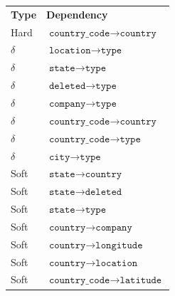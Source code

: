\documentclass{article}
\begin{document}
        \begin{table}[ht]
            \centering
            \begin{tabular}{|p{}|p{}|}
                \hline
                \textbf{Type} & \textbf{Dependency} \\ %
                \Xhline{2\arrayrulewidth}
                Hard & $\texttt{country\_code} \rightarrow \texttt{country}$ \\ %
                \hline
                $\delta$ & $\texttt{location} \rightarrow \texttt{type}$ \\
                \hline
                $\delta$ & $\texttt{state} \rightarrow \texttt{type}$ \\
                \hline
                $\delta$ & $\texttt{deleted} \rightarrow \texttt{type}$ \\
                \hline
                $\delta$ & $\texttt{company} \rightarrow \texttt{type}$ \\
                \hline
                $\delta$ & $\texttt{country\_code} \rightarrow \texttt{country}$ \\
                \hline
                $\delta$ & $\texttt{country\_code} \rightarrow \texttt{type}$ \\
                \hline
                $\delta$ & $\texttt{city} \rightarrow \texttt{type}$ \\
                \hline
                Soft & $\texttt{state} \rightarrow \texttt{country}$ \\ 
                \hline
                Soft & $\texttt{state} \rightarrow \texttt{deleted}$ \\ 
                \hline
                Soft & $\texttt{state} \rightarrow \texttt{type}$ \\ 
                \hline
                Soft & $\texttt{country} \rightarrow \texttt{company}$ \\ 
                \hline
                Soft & $\texttt{country} \rightarrow \texttt{longitude}$ \\
                \hline
                Soft & $\texttt{country} \rightarrow \texttt{location}$ \\ 
                \hline
                Soft & $\texttt{country\_code} \rightarrow \texttt{latitude}$ \\ 
                \hline

\end{tabular}
\end{table}
\end{document}
